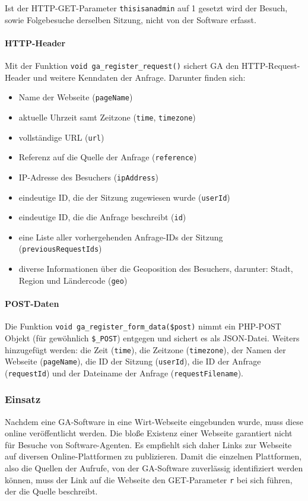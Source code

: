 Ist der HTTP-GET-Parameter \texttt{thisisanadmin} auf 1 gesetzt wird der
Besuch, sowie Folgebesuche derselben Sitzung, nicht von der Software erfasst.

\paragraph{HTTP-Header}
\label{par:ga_http_header}
Mit der Funktion \texttt{void\ ga\_register\_request()} sichert GA den
HTTP-Request-Header und weitere Kenndaten der Anfrage. Darunter finden sich:

\begin{itemize}
\item
  Name der Webseite (\texttt{pageName})
\item
  aktuelle Uhrzeit samt Zeitzone (\texttt{time}, \texttt{timezone})
\item
  vollständige URL (\texttt{url})
\item
  Referenz auf die Quelle der Anfrage (\texttt{reference})
\item
  IP-Adresse des Besuchers (\texttt{ipAddress})
\item
  eindeutige ID, die der Sitzung zugewiesen wurde (\texttt{userId})
\item
  eindeutige ID, die die Anfrage beschreibt (\texttt{id})
\item
  eine Liste aller vorhergehenden Anfrage-IDs der Sitzung
  (\texttt{previousRequestIds})
\item
  diverse Informationen über die Geoposition des Besuchers, darunter: Stadt,
  Region und Ländercode (\texttt{geo})
\end{itemize}

\paragraph{POST-Daten}
\label{par:ga_post_daten}
Die Funktion \texttt{void\ ga\_register\_form\_data(\$post)} nimmt ein PHP-POST
Objekt (für gewöhnlich \texttt{\$\_POST}) entgegen und sichert es als
JSON-Datei. Weiters hinzugefügt werden: die Zeit (\texttt{time}), die Zeitzone
(\texttt{timezone}), der Namen der Webseite (\texttt{pageName}), die ID der
Sitzung (\texttt{userId}), die ID der Anfrage (\texttt{requestId}) und der
Dateiname der Anfrage (\texttt{requestFilename}).

\subsubsection{Einsatz}
\label{ssub:ga_einsatz}
Nachdem eine GA-Software in eine Wirt-Webseite eingebunden wurde, muss diese
online veröffentlicht werden. Die bloße Existenz einer Webseite garantiert
nicht für Besuche von Software-Agenten. Es empfiehlt sich daher Links zur
Webseite auf diversen Online-Plattformen zu publizieren. Damit die einzelnen
Plattformen, also die Quellen der Aufrufe, von der GA-Software zuverlässig
identifiziert werden können, muss der Link auf die Webseite den GET-Parameter
\texttt{r} bei sich führen, der die Quelle beschreibt.


